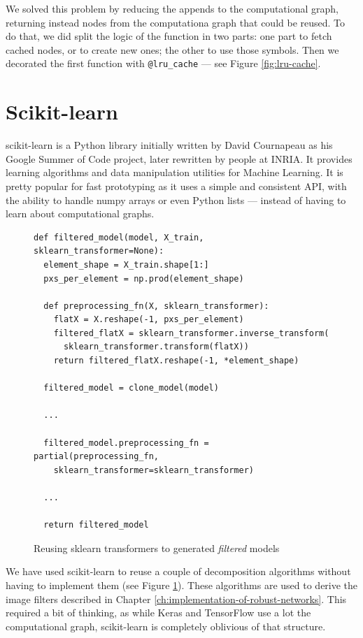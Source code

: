 We solved this problem by reducing the appends to the computational
graph, returning instead nodes from the computationa graph that could
be reused. To do that, we did split the logic of the function in two
parts: one part to fetch cached nodes, or to create new ones; the other
to use those symbols. Then we decorated the first function with
\texttt{@lru\_cache} --- see Figure \ref{fig:lru-cache}.

\section{Scikit-learn}
\label{sec:sklearn}

scikit-learn is a Python library initially written by David Cournapeau
as his Google Summer of Code project, later rewritten by people at
INRIA. It provides learning algorithms and data manipulation utilities
for Machine Learning. It is pretty popular for fast prototyping as it
uses a simple and consistent API, with the ability to handle numpy
arrays or even Python lists --- instead of having to learn about
computational graphs.

\begin{figure}
  \begin{verbatim}
def filtered_model(model, X_train, sklearn_transformer=None):
  element_shape = X_train.shape[1:]
  pxs_per_element = np.prod(element_shape)

  def preprocessing_fn(X, sklearn_transformer):
    flatX = X.reshape(-1, pxs_per_element)
    filtered_flatX = sklearn_transformer.inverse_transform(
      sklearn_transformer.transform(flatX))
    return filtered_flatX.reshape(-1, *element_shape)

  filtered_model = clone_model(model)

  ...

  filtered_model.preprocessing_fn = partial(preprocessing_fn,
    sklearn_transformer=sklearn_transformer)

  ...

  return filtered_model
  \end{verbatim}
  \caption{Reusing sklearn transformers to generated \emph{filtered} models}
  \label{fig:sklearn-code}
\end{figure}

We have used scikit-learn to reuse a couple of decomposition algorithms
without having to implement them (see Figure \ref{fig:sklearn-code}).
These algorithms are used to derive the image filters described in
Chapter \ref{ch:implementation-of-robust-networks}. This required a bit
of thinking, as while Keras and TensorFlow use a lot the computational
graph, scikit-learn is completely oblivious of that structure.


